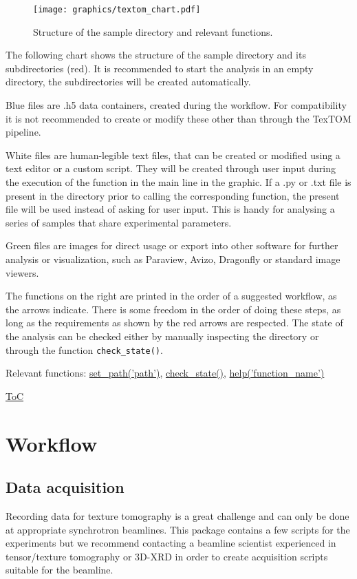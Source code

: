 \begin{figure}[h!]
    \texttt{[image: graphics/textom\_chart.pdf]}
    \centering
    \caption{Structure of the sample directory and relevant functions.}
\end{figure}
The following chart shows the structure of the sample directory and its subdirectories (red).
It is recommended to start the analysis in an empty directory, the subdirectories will be
created automatically.

Blue files are .h5 data containers, created during the workflow. For compatibility it is not
recommended to create or modify these other than through the TexTOM pipeline.

White files are human-legible text files, that can be created or modified using a text editor or
a custom script. They will be created through user input during the execution of the function
in the main line in the graphic. 
If a .py or .txt file is present in the directory prior to calling the corresponding function,
the present file will be used instead of asking for user input. This is handy for analysing
a series of samples that share experimental parameters.

Green files are images for direct usage or export into other software for further analysis or visualization,
such as Paraview, Avizo, Dragonfly or standard image viewers.

The functions on the right are printed in the order of a suggested workflow, as the arrows indicate.
There is some freedom in the order of doing these steps, as long as the requirements as shown
by the red arrows are respected. The state of the analysis can be checked either by
manually inspecting the directory or through the function \texttt{check\_state()}.

Relevant functions:
\hyperref[fun:setpath]{set\_path('path')},
\hyperref[fun:checkstate]{check\_state()},
\hyperref[fun:help]{help('function\_name')}

\begin{flushright}
    \hyperref[toc]{ToC}
\end{flushright}

\newpage
\section{Workflow}

\subsection{Data acquisition}
Recording data for texture tomography is a great challenge and can only be done at appropriate synchrotron beamlines.
This package contains a few scripts for the experiments but we recommend contacting 
a beamline scientist experienced in tensor/texture tomography or 
3D-XRD in order to create acquisition scripts suitable for the beamline.

